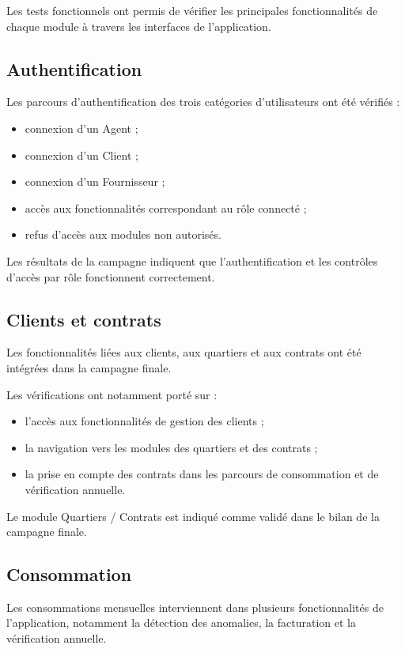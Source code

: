 Les tests fonctionnels ont permis de vérifier les principales fonctionnalités de chaque module à travers les interfaces de l'application.

\subsection{Authentification}

Les parcours d'authentification des trois catégories d'utilisateurs ont été vérifiés :
\begin{itemize}
    \item connexion d'un Agent ;
    \item connexion d'un Client ;
    \item connexion d'un Fournisseur ;
    \item accès aux fonctionnalités correspondant au rôle connecté ;
    \item refus d'accès aux modules non autorisés.
\end{itemize}

Les résultats de la campagne indiquent que l'authentification et les contrôles d'accès par rôle fonctionnent correctement.

\subsection{Clients et contrats}

Les fonctionnalités liées aux clients, aux quartiers et aux contrats ont été intégrées dans la campagne finale.

Les vérifications ont notamment porté sur :
\begin{itemize}
    \item l'accès aux fonctionnalités de gestion des clients ;
    \item la navigation vers les modules des quartiers et des contrats ;
    \item la prise en compte des contrats dans les parcours de consommation et de vérification annuelle.
\end{itemize}

Le module Quartiers / Contrats est indiqué comme validé dans le bilan de la campagne finale.

\subsection{Consommation}

Les consommations mensuelles interviennent dans plusieurs fonctionnalités de l'application, notamment la détection des anomalies, la facturation et la vérification annuelle.

